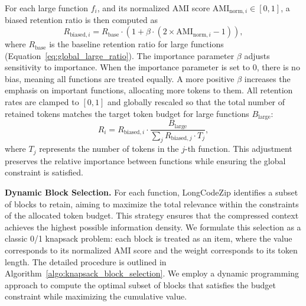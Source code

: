 \documentclass[10pt,conference]{IEEEtran}
\newcommand{\todoc}[2]{{\textcolor{#1}{\textbf{[#2]}}}}
\newcommand{\shi}[1]{\todoc{orange}{Shi: #1}}
\newcommand{\qian}[1]{\todoc{violet}{Qian: #1}}
\newcommand{\approach}{{LongCodeZip}\xspace} %
\begin{document}
For each large function $f_i$, and its normalized AMI score $\text{AMI}_{\text{norm},i}\in [0,1]$, a biased retention ratio is then computed as
\begin{equation}
R_{\text{biased}, i} = R_{\text{base}} \cdot (1 + \beta \cdot (2 \times \text{AMI}_{\text{norm}, i} - 1)),
\label{eq:biased_compression}
\end{equation}
where $R_{\text{base}}$ is the baseline retention ratio for large functions (Equation~\ref{eq:global_large_ratio}). The importance parameter $\beta$ adjusts sensitivity to importance. When the importance parameter is set to 0, there is no bias, meaning all functions are treated equally. A more positive $\beta$ increases the emphasis on important functions, allocating more tokens to them. All retention rates are clamped to $[0,1]$ and globally rescaled so that the total number of retained tokens matches the target token budget for large functions $B_{\text{large}}$: 
\begin{equation}
R_{i} = R_{\text{biased},i} \cdot \frac{B_{\text{large}}}{\sum_j R_{\text{biased},j} \cdot T_j},
\label{eq:rate_adjusted}
\end{equation}
where $T_j$ represents the number of tokens in the $j$-th function.
This adjustment preserves the relative importance between functions while ensuring the global constraint is satisfied.


\noindent\textbf{Dynamic Block Selection.}
For each function, \approach identifies a subset of blocks to retain, aiming to maximize the total relevance within the constraints of the allocated token budget. This strategy ensures that the compressed context achieves the highest possible information density. We formulate this selection as a classic 0/1 knapsack problem: each block is treated as an item, where the value corresponds to its normalized AMI score and the weight corresponds to its token length. The detailed procedure is outlined in Algorithm~\ref{algo:knapsack_block_selection}. We employ a dynamic programming approach to compute the optimal subset of blocks that satisfies the budget constraint while maximizing the cumulative value.
\end{document}
